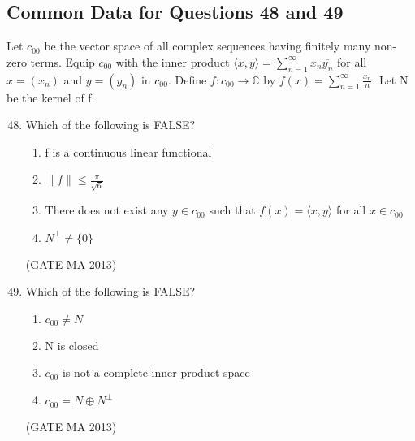 \documentclass[journal,12pt,onecolumn]{IEEEtran}
\theoremstyle{remark}
\begin{document}
\subsection*{Common Data for Questions 48 and 49}
Let $c_{00}$ be the vector space of all complex sequences having finitely many non-zero terms. Equip $c_{00}$ with the inner product $\langle x, y \rangle = \sum_{n=1}^{\infty} x_n \overline{y_n}$ for all $x=(x_n)$ and $y=(y_n)$ in $c_{00}$. Define $f: c_{00} \rightarrow \mathbb{C}$ by $f(x) = \sum_{n=1}^{\infty} \frac{x_n}{n}$. Let N be the kernel of f.
\begin{enumerate}
    \setcounter{enumi}{47}
    \item Which of the following is FALSE?
    \begin{enumerate}
        \item f is a continuous linear functional
        \item $\|f\| \le \frac{\pi}{\sqrt{6}}$
        \item There does not exist any $y \in c_{00}$ such that $f(x) = \langle x, y \rangle$ for all $x \in c_{00}$
        \item $N^{\perp} \neq \{0\}$
    \end{enumerate}
    \hfill (GATE MA 2013)
    \item Which of the following is FALSE?
    \begin{enumerate}
        \item $c_{00} \neq N$
        \item N is closed
        \item $c_{00}$ is not a complete inner product space
        \item $c_{00} = N \oplus N^{\perp}$
    \end{enumerate}
    \hfill (GATE MA 2013)
\end{enumerate}
\end{document}

